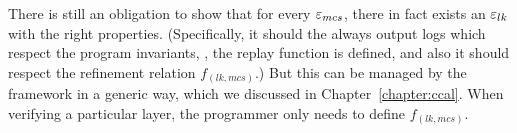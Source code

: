 There is still an obligation to show that for every ${\varepsilon}_{mcs}$, there
in fact exists an ${\varepsilon}_{lk}$ with the right
properties. (Specifically, it should the always output logs which
respect the program invariants, \ie, the replay function is defined,
and also it should respect the refinement relation $f_{(lk, mcs)}$.) But this can
be managed by the framework in a generic way, which we discussed in Chapter~\ref{chapter:ccal}. When
verifying a particular layer, the programmer only needs to define $f_{(lk, mcs)}$.

